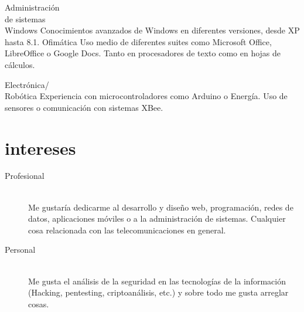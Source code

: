 \documentclass[hidelinks]{friggeri-cv} %
\begin{document}
\begin{entrylist}
\entry
{Administración \\ de sistemas \\ Windows}
{}
{}
{Conocimientos avanzados de Windows en diferentes versiones, desde XP hasta 8.1.}
\entry
{Ofimática}
{}
{}
{Uso medio de diferentes suites como Microsoft Office, LibreOffice o Google Docs.
Tanto en procesadores de texto como en hojas de cálculos.}

\entry
{Electrónica/ \\ Robótica}
{}
{}
{Experiencia con microcontroladores como Arduino o Energía. Uso de sensores o comunicación
con sistemas XBee.}
\end{entrylist}



\section{intereses}

\begin{description}
  \item[Profesional] \hfill \\
Me gustaría dedicarme al desarrollo y diseño web, programación, redes de datos, aplicaciones
móviles o a la administración de sistemas. Cualquier cosa relacionada con las telecomunicaciones
en general.

\item[Personal] \hfill \\
Me gusta el análisis de la seguridad en las tecnologías de la información
(Hacking, pentesting, criptoanálisis, etc.) y sobre todo me gusta arreglar cosas.
\end{description}




\end{document}
